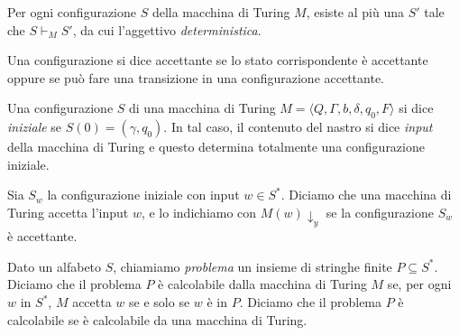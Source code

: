 \begin{osservazione}
 Per ogni configurazione $S$ della macchina di Turing $M$, esiste al più una
 $S'$ tale che $S \vdash_M S'$, da cui l'aggettivo \emph{deterministica}.
\end{osservazione}


\begin{definizione}
 Una configurazione si dice accettante se lo stato corrispondente è accettante
 oppure se può fare una transizione in una configurazione accettante.
\end{definizione}

\begin{definizione}
 Una configurazione $S$ di una macchina di Turing
 $M=\langle Q, \Gamma, b, \delta, q_0, F \rangle$ si dice \emph{iniziale} se
 $S(0) = (\gamma, q_0)$. In tal caso, il contenuto del nastro
 si dice \emph{input} della macchina di Turing e questo determina totalmente
 una configurazione iniziale.
\end{definizione}

\begin{definizione}
\label{def:accept-input}
 Sia $S_w$ la configurazione iniziale con input $w \in S^\ast$. Diciamo che
 una macchina di Turing accetta l'input $w$, e lo indichiamo con $M(w)\downarrow_y$
 se la configurazione $S_w$ è accettante.
\end{definizione}

\begin{definizione}
 Dato un alfabeto $S$, chiamiamo \emph{problema} un insieme di stringhe finite
 $P \subseteq S^\ast$. Diciamo che il problema $P$ è calcolabile dalla macchina
 di Turing $M$ se, per ogni $w$ in $S^\ast$, $M$ accetta $w$ se e solo se $w$
 è in $P$. Diciamo che il problema $P$ è calcolabile se è calcolabile da una
 macchina di Turing.
\end{definizione}

